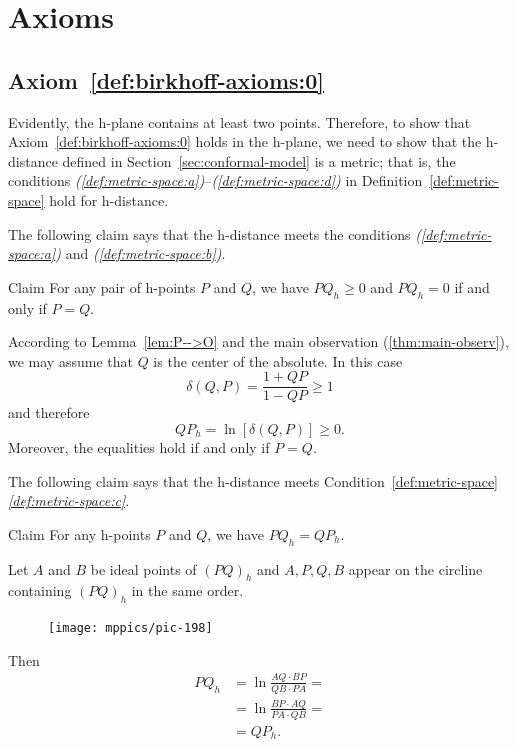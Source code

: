 \section[Axioms]{Axioms}
\subsection*{Axiom~\ref{def:birkhoff-axioms:0}}

Evidently, the h-plane contains at least two points.
Therefore, to show that Axiom~\ref{def:birkhoff-axioms:0} holds in the h-plane, we need to show that the h-distance defined in Section~\ref{sec:conformal-model} is a metric;
that is, the conditions \textit{(\ref{def:metric-space:a})}--\textit{(\ref{def:metric-space:d})} 
in Definition~\ref{def:metric-space} hold for h-distance.


The following claim says that the h-distance meets the conditions \textit{(\ref{def:metric-space:a})} 
and \textit{(\ref{def:metric-space:b})}.

\begin{thm}{Claim}
For any pair of h-points $P$ and $Q$, we have
$PQ_h\ge 0$
and $PQ_h=0$ if and only if $P=Q$.
\end{thm}


According to Lemma~\ref{lem:P-->O}
and the main observation (\ref{thm:main-observ}), 
we may assume that $Q$ is the center of the absolute.
In this case
$$
\delta(Q,P)=\frac{1+QP}{1-QP}\ge 1$$
and therefore
$$QP_h=\ln[\delta(Q,P)]\ge 0.$$
Moreover, the equalities hold if and only if $P=Q$.
\qeds

The following claim says that the h-distance meets Condition~\ref{def:metric-space}\textit{\ref{def:metric-space:c}}.

\begin{thm}{Claim}
For any h-points $P$ and $Q$, we have
$PQ_h=QP_h$.
\end{thm}

Let $A$ and $B$ be ideal points of $(PQ)_h$ and
$A,P,Q,B$ appear on the circline containing $(PQ)_h$ in the same order.

{

\begin{figure}
\vskip-5mm
\centering
\texttt{[image: mppics/pic-198]}
\end{figure}

Then
\begin{align*}
PQ_h
&=\ln\frac{AQ\cdot BP}{QB\cdot PA}
=
\\
&=\ln\frac{BP\cdot AQ}{PA\cdot QB}=
\\
&=QP_h.
\end{align*}
\qedsf

}


